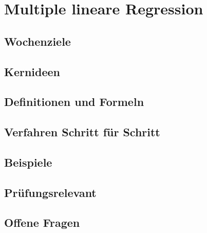 \chapter{Multiple lineare Regression}
\label{kap:07-multiple-regression}

\section*{Wochenziele}
\begin{wochenziele}
\end{wochenziele}

\section{Kernideen}

\section{Definitionen und Formeln}

\section{Verfahren Schritt für Schritt}

\section{Beispiele}

\section{Prüfungsrelevant}

\section{Offene Fragen}
